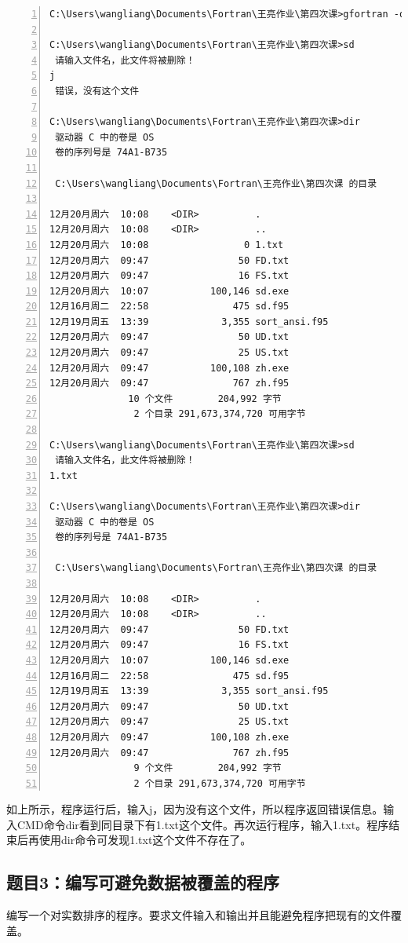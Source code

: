 \documentclass[hyperref,UTF-8]{ctexart}
\begin{document}
\begin{Verbatim}[numbers=left,fontsize=\small]
C:\Users\wangliang\Documents\Fortran\王亮作业\第四次课>gfortran -o sd sd.f95

C:\Users\wangliang\Documents\Fortran\王亮作业\第四次课>sd
 请输入文件名，此文件将被删除！
j
 错误，没有这个文件

C:\Users\wangliang\Documents\Fortran\王亮作业\第四次课>dir
 驱动器 C 中的卷是 OS
 卷的序列号是 74A1-B735

 C:\Users\wangliang\Documents\Fortran\王亮作业\第四次课 的目录

12月20月周六  10:08    <DIR>          .
12月20月周六  10:08    <DIR>          ..
12月20月周六  10:08                 0 1.txt
12月20月周六  09:47                50 FD.txt
12月20月周六  09:47                16 FS.txt
12月20月周六  10:07           100,146 sd.exe
12月16月周二  22:58               475 sd.f95
12月19月周五  13:39             3,355 sort_ansi.f95
12月20月周六  09:47                50 UD.txt
12月20月周六  09:47                25 US.txt
12月20月周六  09:47           100,108 zh.exe
12月20月周六  09:47               767 zh.f95
              10 个文件        204,992 字节
               2 个目录 291,673,374,720 可用字节

C:\Users\wangliang\Documents\Fortran\王亮作业\第四次课>sd
 请输入文件名，此文件将被删除！
1.txt

C:\Users\wangliang\Documents\Fortran\王亮作业\第四次课>dir
 驱动器 C 中的卷是 OS
 卷的序列号是 74A1-B735

 C:\Users\wangliang\Documents\Fortran\王亮作业\第四次课 的目录

12月20月周六  10:08    <DIR>          .
12月20月周六  10:08    <DIR>          ..
12月20月周六  09:47                50 FD.txt
12月20月周六  09:47                16 FS.txt
12月20月周六  10:07           100,146 sd.exe
12月16月周二  22:58               475 sd.f95
12月19月周五  13:39             3,355 sort_ansi.f95
12月20月周六  09:47                50 UD.txt
12月20月周六  09:47                25 US.txt
12月20月周六  09:47           100,108 zh.exe
12月20月周六  09:47               767 zh.f95
               9 个文件        204,992 字节
               2 个目录 291,673,374,720 可用字节
\end{Verbatim}

如上所示，程序运行后，输入j，因为没有这个文件，所以程序返回错误信息。输入CMD命令dir看到同目录下有1.txt这个文件。再次运行程序，输入1.txt。程序结束后再使用dir命令可发现1.txt这个文件不存在了。
\subsection{题目3：编写可避免数据被覆盖的程序}
编写一个对实数排序的程序。要求文件输入和输出并且能避免程序把现有的文件覆盖。
\end{document}
